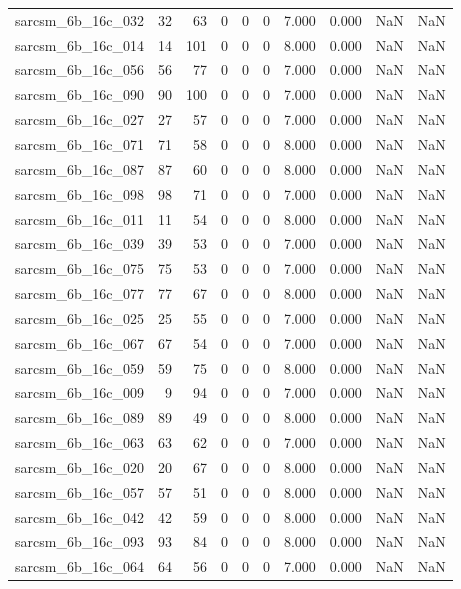 \documentclass{article}
\begin{document}
\begin{longtable}{lrrrrrrrrr}
sarcsm\_6b\_16c\_032 & 32 & 63 & 0 & 0 & 0 & 7.000 & 0.000 & NaN & NaN \\
sarcsm\_6b\_16c\_014 & 14 & 101 & 0 & 0 & 0 & 8.000 & 0.000 & NaN & NaN \\
sarcsm\_6b\_16c\_056 & 56 & 77 & 0 & 0 & 0 & 7.000 & 0.000 & NaN & NaN \\
sarcsm\_6b\_16c\_090 & 90 & 100 & 0 & 0 & 0 & 7.000 & 0.000 & NaN & NaN \\
sarcsm\_6b\_16c\_027 & 27 & 57 & 0 & 0 & 0 & 7.000 & 0.000 & NaN & NaN \\
sarcsm\_6b\_16c\_071 & 71 & 58 & 0 & 0 & 0 & 8.000 & 0.000 & NaN & NaN \\
sarcsm\_6b\_16c\_087 & 87 & 60 & 0 & 0 & 0 & 8.000 & 0.000 & NaN & NaN \\
sarcsm\_6b\_16c\_098 & 98 & 71 & 0 & 0 & 0 & 7.000 & 0.000 & NaN & NaN \\
sarcsm\_6b\_16c\_011 & 11 & 54 & 0 & 0 & 0 & 8.000 & 0.000 & NaN & NaN \\
sarcsm\_6b\_16c\_039 & 39 & 53 & 0 & 0 & 0 & 7.000 & 0.000 & NaN & NaN \\
sarcsm\_6b\_16c\_075 & 75 & 53 & 0 & 0 & 0 & 7.000 & 0.000 & NaN & NaN \\
sarcsm\_6b\_16c\_077 & 77 & 67 & 0 & 0 & 0 & 8.000 & 0.000 & NaN & NaN \\
sarcsm\_6b\_16c\_025 & 25 & 55 & 0 & 0 & 0 & 7.000 & 0.000 & NaN & NaN \\
sarcsm\_6b\_16c\_067 & 67 & 54 & 0 & 0 & 0 & 7.000 & 0.000 & NaN & NaN \\
sarcsm\_6b\_16c\_059 & 59 & 75 & 0 & 0 & 0 & 8.000 & 0.000 & NaN & NaN \\
sarcsm\_6b\_16c\_009 & 9 & 94 & 0 & 0 & 0 & 7.000 & 0.000 & NaN & NaN \\
sarcsm\_6b\_16c\_089 & 89 & 49 & 0 & 0 & 0 & 8.000 & 0.000 & NaN & NaN \\
sarcsm\_6b\_16c\_063 & 63 & 62 & 0 & 0 & 0 & 7.000 & 0.000 & NaN & NaN \\
sarcsm\_6b\_16c\_020 & 20 & 67 & 0 & 0 & 0 & 8.000 & 0.000 & NaN & NaN \\
sarcsm\_6b\_16c\_057 & 57 & 51 & 0 & 0 & 0 & 8.000 & 0.000 & NaN & NaN \\
sarcsm\_6b\_16c\_042 & 42 & 59 & 0 & 0 & 0 & 8.000 & 0.000 & NaN & NaN \\
sarcsm\_6b\_16c\_093 & 93 & 84 & 0 & 0 & 0 & 8.000 & 0.000 & NaN & NaN \\
sarcsm\_6b\_16c\_064 & 64 & 56 & 0 & 0 & 0 & 7.000 & 0.000 & NaN & NaN \\

\end{longtable}
\end{document}
